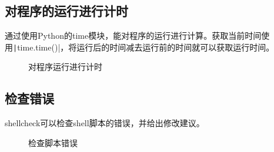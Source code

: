 \documentclass[fontset=ubuntu]{ctexart}
\begin{document}
\subsection{对程序的运行进行计时}
通过使用Python的time模块，能对程序的运行进行计算。获取当前时间使用\texttt|time.time()|，将运行后的时间减去运行前的时间就可以获取运行时间。
\begin{figure}[htb]
    \centering
    \caption{对程序运行进行计时}
    \label{time}
\end{figure}

\subsection{检查错误}
shellcheck可以检查shell脚本的错误，并给出修改建议。
\begin{figure}[htb]
    \centering
    \caption{检查脚本错误}
   \label{shellcheck}
\end{figure}
\end{document}
